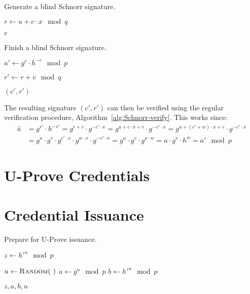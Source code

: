 \begin{algorithm}
  \caption{Generate a blind Schnorr signature.}
  \label{alg:Schnorr-blind-sign}
  \addtolength{\baselineskip}{1mm}
  \begin{algorithmic}[1]
      \State $r \gets u + c \cdot x \mod q$

      \Return $r$
    \EndFunction
  \end{algorithmic}
\end{algorithm}

\begin{algorithm}
  \caption{Finish a blind Schnorr signature.}
  \label{alg:Schnorr-finish}
  \addtolength{\baselineskip}{1mm}
  \begin{algorithmic}[1]
      \State $a' \gets g^r \cdot h^{-c} \mod p$
        \Return {}
      \EndIf

      \State $r' \gets r + v \mod q$

      \Return $(c', r')$
    \EndFunction
  \end{algorithmic}
\end{algorithm}

The resulting signature $(c', r')$ can then be verified using the regular
verification procedure, Algorithm~\ref{alg:Schnorr-verify}. This works since:
\begin{align*}
  \hat{a}
  & = g^{r'} \cdot h^{-c'}
  = g^{r + v} \cdot g^{-c' \cdot x}
  = g^{u + c \cdot x + v} \cdot g^{-c' \cdot x}
  = g^{u + (c' + w) \cdot x + v} \cdot g^{-c' \cdot x} \\
  & = g^u \cdot g^v \cdot g^{c' \cdot x} \cdot g^{w \cdot x} \cdot g^{-c' \cdot x}
  = g^u \cdot g^v \cdot g^{x \cdot w}
  = a \cdot g^v \cdot h^w
  = a' \mod p
\end{align*}

\section{U-Prove Credentials}

\section{Credential Issuance}

\begin{algorithm}
  \caption{Prepare for U-Prove issuance.}
  \label{alg:UP-issuance-prepare}
  \addtolength{\baselineskip}{1mm}
  \begin{algorithmic}[1]
      \State $z \gets h'^x \mod p$

      \State $u \gets \Call{Random}{~}$
      \State $a \gets g^u \mod p$
      \State $b \gets h'^u \mod p$
      
      \Return $z, a, b, u$
    \EndFunction
  \end{algorithmic}
\end{algorithm}

